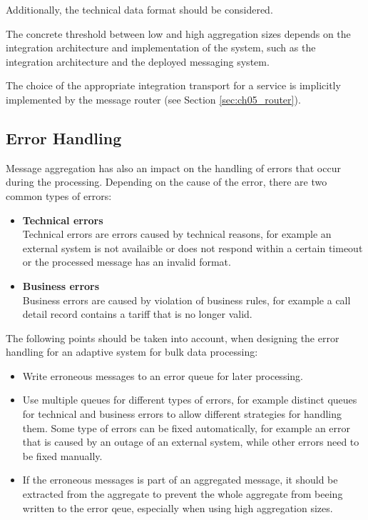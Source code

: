 Additionally, the technical data format should be considered. 

The concrete threshold between low and high aggregation sizes depends on the integration architecture and implementation of the system, such as the integration architecture and the deployed messaging system.

The choice of the appropriate integration transport for a service is implicitly implemented by the message router (see Section \ref{sec:ch05_router}).

\subsection{Error Handling}

Message aggregation has also an impact on the handling of errors that occur during the processing. Depending on the cause of the error, there are two common types of errors: 
\begin{itemize}
	\item \textbf{Technical errors}\\
	Technical errors are errors caused by technical reasons, for example an external system is not availaible or does not respond within a certain timeout or the processed message has an invalid format.
	\item \textbf{Business errors}\\
	Business errors are caused by violation of business rules, for example a call detail record contains a tariff that is no longer valid.
\end{itemize}

The following points should be taken into account, when designing the error handling for an adaptive system for bulk data processing:
\begin{itemize}
	\item Write erroneous messages to an error queue for later processing. 
	\item Use multiple queues for different types of errors, for example distinct queues for technical and business errors to allow different strategies for handling them. Some type of errors can be fixed automatically, for example an error that is caused by an outage of an external system, while other errors need to be fixed manually.
	\item If the erroneous messages is part of an aggregated message, it should be extracted from the aggregate to prevent the whole aggregate from beeing written to the error qeue, especially when using high aggregation sizes.
\end{itemize}

